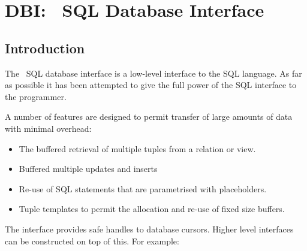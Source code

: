 %
% 
% 
% 
% 

\chapter{DBI: \eclipse\ SQL Database Interface}
\label{chapdbi}
\section{Introduction}

The \eclipse\ SQL database interface is a low-level interface to the SQL
language. As far as possible it has been attempted to give the
full power of the SQL interface to the programmer.

A number of features are designed to permit transfer of large amounts
of data with minimal overhead:
\begin{itemize}
\item The buffered retrieval of multiple tuples from
a relation or view.
\item Buffered multiple updates and inserts
\item Re-use of SQL statements that are parametrised with placeholders.
\item Tuple templates to permit the allocation  and re-use of fixed size
buffers.
\end{itemize}

The interface provides safe handles to database cursors. Higher
level interfaces can be constructed on top of this. For
example:


